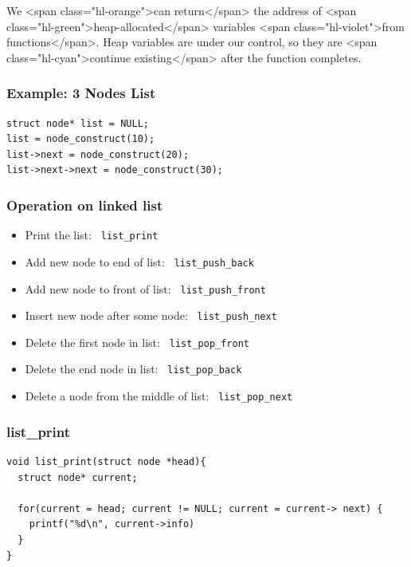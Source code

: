 \documentclass{../c-lecture}
\begin{document}
\begin{frame}
  \begin{block}{}
    We <span class="hl-orange">can return</span> the address of
    <span class="hl-green">heap-allocated</span> variables
    <span class="hl-violet">from functions</span>. Heap variables are under our
    control, so they are <span class="hl-cyan">continue existing</span> after
    the function completes.
  \end{block}
\end{frame}

\begin{frame}[fragile]
  \frametitle{Example: 3 Nodes List}
  \begin{verbatim}
struct node* list = NULL;
list = node_construct(10);
list->next = node_construct(20);
list->next->next = node_construct(30);
  \end{verbatim}
\end{frame}

\begin{frame}
  \frametitle{Operation on linked list}
  \begin{itemize}
    \item Print the list: \texttt{\color{Orange} list\_print}
    \item
      Add new node to end of list:
      \texttt{\color{LimeGreen} list\_push\_back}

    \item
      Add new node to front of list:
      \texttt{\color{Yellow} list\_push\_front}

    \item
      Insert new node after some node:
      \texttt{\color{Cyan} list\_push\_next}

    \item
      Delete the first node in list:
      \texttt{\color{Violet} list\_pop\_front}

    \item
      Delete the end node in list:
      \texttt{\color{RubineRed} list\_pop\_back}

    \item
      Delete a node from the middle of list:
      \texttt{\color{RedOrange} list\_pop\_next}

  \end{itemize}
\end{frame}

\begin{frame}[fragile]
  \frametitle{list\_print}
  \begin{verbatim}
void list_print(struct node *head){
  struct node* current;

  for(current = head; current != NULL; current = current-> next) {
    printf("%d\n", current->info)
  }
}
  \end{verbatim}
\end{frame}
\end{document}
